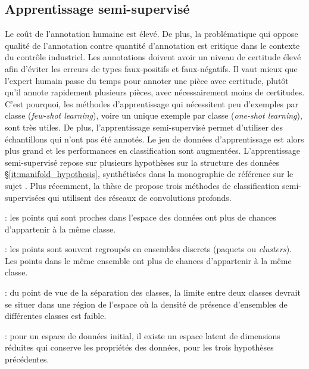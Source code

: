 \subsection{Apprentissage semi-supervisé}
Le coût de l'annotation humaine est élevé.
De plus, la problématique qui oppose qualité de l'annotation contre quantité d'annotation est critique dans le contexte du contrôle industriel.
Les annotations doivent avoir un niveau de certitude élevé afin d'éviter les erreurs de types faux-positifs et faux-négatifs.
Il vaut mieux que l'expert humain passe du temps pour annoter une pièce avec certitude, plutôt qu'il annote rapidement plusieurs pièces, avec nécessairement moins de certitudes.
C'est pourquoi, les méthodes d'apprentissage qui nécessitent peu d'exemples par classe (\textit{few-shot learning}), voire un unique exemple par classe (\textit{one-shot learning}), sont très utiles.
De plus, l'apprentissage semi-supervisé permet d'utiliser des échantillons qui n'ont pas été annotés.
Le jeu de données d'apprentissage est alors plus grand et les performances en classification sont augmentées.
L'apprentissage semi-supervisé repose sur plusieurs hypothèses sur la structure des données §\ref{it:manifold_hypothesis}, synthétisées dans la monographie de référence sur le sujet  \cite{chapelle_semi-supervised_2010}.
Plus récemment, la thèse de \citeauthor{durand_weakly_2017} \cite{durand_weakly_2017} propose trois méthodes de classification semi-supervisées qui utilisent des réseaux de convolutions profonds.

\begin{description} \label{it:manifold_hypothesis}
    \item[Hypothèse de continuité] : les points qui sont proches dans l'espace des données ont plus de chances d'appartenir à la même classe.
    \item[Hypothèse d'ensembles] : les points sont souvent regroupés en ensembles discrets (paquets ou \textit{clusters}). Les points dans le même ensemble ont plus de chances d'appartenir à la même classe.
    \item[Hypothèse de densité faible] : du point de vue de la séparation des classes, la limite entre deux classes devrait se situer dans une région de l'espace où la densité de présence d'ensembles de différentes classes est faible.
    \item[Hypothèse de variétés] : pour un espace de données initial, il existe un espace latent de dimensions réduites qui conserve les propriétés des données, pour les trois hypothèses précédentes.
\end{description}

